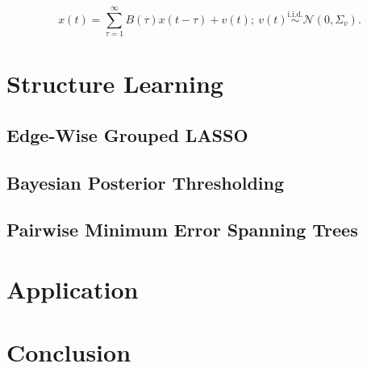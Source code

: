 \documentclass[12pt]{article}
\begin{document}
\begin{equation}
  x(t) = \sum_{\tau = 1}^\infty B(\tau) x(t - \tau) + v(t);\ v(t) \overset{\text{i.i.d.}}{\sim} \mathcal{N}(0, \Sigma_v).
\end{equation}

\section{Structure Learning}
\subsection{Edge-Wise Grouped LASSO}
\subsection{Bayesian Posterior Thresholding}
\subsection{Pairwise Minimum Error Spanning Trees}
\section{Application}
\section{Conclusion}

\printbibliography
\end{document}
